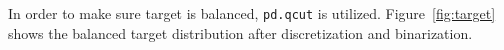 In order to make sure target is balanced, \texttt{pd.qcut} is utilized. Figure~\ref{fig:target} shows the balanced target distribution after discretization and binarization.









